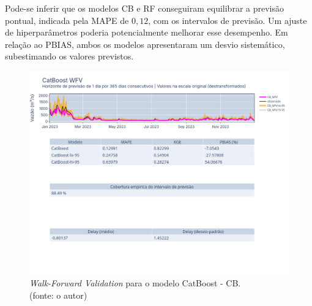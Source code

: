 Pode-se inferir que os modelos CB e RF conseguiram equilibrar a previsão pontual, indicada pela MAPE de $0,12$, com os intervalos de previsão. Um ajuste de hiperparâmetros poderia potencialmente melhorar esse desempenho. Em relação ao PBIAS, ambos os modelos apresentaram um desvio sistemático, subestimando os valores previstos.


\begin{figure}[!h]
\centering
\includegraphics[scale=0.33]{Figuras/jequiti/resultados/CB_WFV_LOG.png}
\caption{\textit{Walk-Forward Validation} para o modelo CatBoost - CB.\\(fonte: o autor)}
\label{fig:jequiti_CB_WFV_LOG}
\end{figure}

